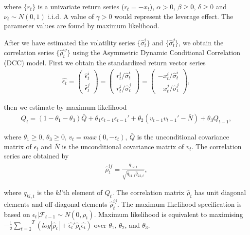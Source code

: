 \documentclass[12pt]{article}
\begin{document}
\noindent where $\{r_t\}$ is a univariate return series ($r_t=-x_t$), $\alpha>0$, $\beta \geq 0$,  $\delta \geq 0$ and  $\nu_t\sim N\left(0,1\right)$ i.i.d. A value of $\gamma>0$ would represent the leverage effect. The parameter values are found by maximum likelihood.

After we have estimated the volatility series $\{\hat{\sigma}^i_t\}$ and $\{\hat{\sigma}^j_t\}$, we obtain the correlation series $\{\hat{\rho}^{ij}_t\}$ using the Asymmetric Dynamic Conditional Correlation (DCC) model. First we obtain the standardized return vector series
\begin{align}
\hat{\epsilon_t}=\left(\begin{array}{c} \hat{\epsilon}^i_t \\ \hat{\epsilon}^j_t \end{array} \right)=\left(\begin{array}{c} r^i_t/\hat{\sigma}^i_t \\ r^j_t/\hat{\sigma}^j_t \end{array} \right)
=\left(\begin{array}{c} -x^i_t/\hat{\sigma}^i_t \\ -x^j_t/\hat{\sigma}^j_t \end{array} \right) ,
\label{epsvec}
\end{align}

\noindent then we estimate by maximum likelihood
\begin{align}
Q_t=\left(1-\theta_1-\theta_3\right)\bar{Q}+\theta_1\epsilon_{t-1}\epsilon_{t-1}'  + \theta_2 (v_{t-1}v_{t-1}'-\bar{N}) +\theta_3 Q_{t-1} , \label{Qeqt}
\end{align}

\noindent where $\theta_1\geq0$, $\theta_3\geq0$, $v_t=max(0,-\epsilon_t)$, $\bar{Q}$ is the unconditional covariance matrix of $\epsilon_t$ and $\bar{N}$ is the unconditional covariance matrix of $v_t$. The correlation series are obtained by
\begin{align}
\hat{\rho}^{ij}_t=\frac{\hat{q}_{12,t}}{\sqrt{\hat{q}_{11,t}\hat{q}_{22,t}}} ,
\end{align}

\noindent where $q_{kl,t}$ is the $kl$'th element of $Q_t$. The correlation matrix $\hat{\rho}_t$ has unit diagonal elements and off-diagonal elements $\hat{\rho}^{ij}_t$. The maximum likelihood specification is based on  $\epsilon_t|\mathcal{F}_{t-1}\sim N\left(0,\rho_t\right)$. Maximum likelihood is equivalent to maximising $-\frac{1}{2}\stackrel{T}{\underset{t=2}{\sum}}(log|\hat{\rho}_t|+\hat{\epsilon_t}'\hat{\rho}_t\hat{\epsilon_t})$ over $\theta_1$, $\theta_2$, and $\theta_3$.
\end{document}
